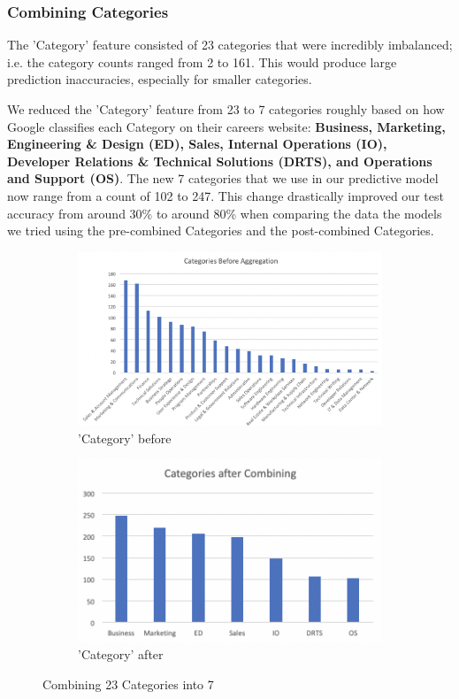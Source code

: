 \documentclass[9.5 pt]{article}
\begin{document}
\subsubsection{Combining Categories}
The 'Category' feature consisted of 23 categories that were incredibly imbalanced; i.e. the category counts ranged from 2 to 161. This would produce large prediction inaccuracies, especially for smaller categories. \par
We reduced the 'Category' feature from 23 to 7 categories roughly based on how Google classifies each Category on their careers website: \textbf{Business, Marketing, Engineering \& Design (ED), Sales, Internal Operations (IO), Developer Relations \& Technical Solutions (DRTS), and Operations and Support (OS)}. The new 7 categories that we use in our predictive model now range from a count of 102 to 247. This change drastically improved our test accuracy from around 30\% to around 80\% when comparing the data the models we tried using the pre-combined Categories and the post-combined Categories. 

\begin{figure}
\centering
\begin{subfigure}{.5\textwidth}
  \centering  \includegraphics[width=1\linewidth]{Categories.png}
  \caption{'Category' before}
  \label{fig:sub1}
\end{subfigure}%
\begin{subfigure}{.5\textwidth}
  \centering
  \includegraphics[width=1\linewidth]{categoriesafter.png}
  \caption{'Category' after}
  \label{fig:sub2}
\end{subfigure}
\caption{Combining 23 Categories into 7}
\label{fig:test}
\end{figure}
\vspace{1.5}
\end{document}
